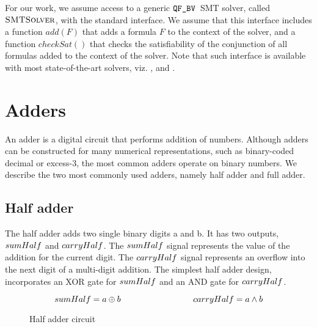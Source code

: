 For our work, we assume access to a generic $\texttt{QF\_BV}$~SMT solver, called
$\textsc{SMTSolver}$, with the standard interface.
%
We assume that this interface includes a function $add(F)$ that adds a
formula $F$ to the context of the solver, and a function $checkSat()$
that checks the satisfiability of the conjunction of all formulas
added to the context of the solver.  Note that such interface is
available with most state-of-the-art solvers, viz. {\boolector},
{\cvcfour} and {\zthree}.


\section{Adders}

An adder is a digital circuit that performs addition of numbers.
Although adders can be constructed for many numerical representations, such as binary-coded decimal or excess-3, the most common adders operate on binary numbers. We describe the two most commonly used 
adders, namely half adder and full adder.

\subsection{Half adder}

The half adder adds two single binary digits a and b. It has two outputs, $sumHalf$ and $carryHalf$. The $sumHalf$ signal represents the value of the addition for the current digit. The $carryHalf$ signal represents an overflow into the next digit of a multi-digit addition.
The simplest half adder design, incorporates an XOR gate for $sumHalf$ and an AND gate for $carryHalf$.

\[
\sumOfHalfAdder = a \oplus b \hspace{3 cm} \carryOfHalfAdder = a \land b 
\]

\begin{figure}[h]
\usetikzlibrary[arrows]
\centering
{}
\caption{Half adder circuit}
\end{figure}


